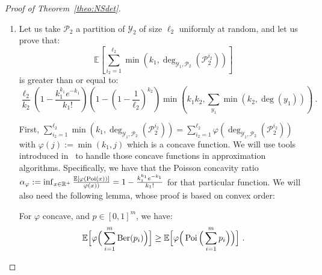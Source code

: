 \begin{proof}[Proof of Theorem~\ref{theo:NSdet}]
\begin{enumerate}
However the function $f : x \mapsto 1-\left(1-\frac{1}{\ell_1}\right)^x$ is nondecreasing concave with $f(0)=0$, so $\frac{f(x)}{x} \geq \frac{f(y)}{y}$ for $x \leq y$. In particular, we have that:
\[ f(\min(k_1,\deg_{\mathcal{Y}_1,\mathcal{P}_2}(\mathcal{P}_2^{i_2}))) \geq \frac{\min(k_1,\deg_{\mathcal{Y}_1,\mathcal{P}_2}(\mathcal{P}_2^{i_2})))}{k_1}f(k_1) \ , \]
and thus:
\begin{equation}
  \begin{aligned}
    \mathbb{E}_{\mathcal{P}_1}[e_{G_W}(\mathcal{P}_1,\mathcal{P}_2)] &\geq \ell_1\sum_{i_2=1}^{\ell_2}\left(1-\left(1-\frac{1}{\ell_1}\right)^{\min(k_1,\deg_{\mathcal{Y}_1,\mathcal{P}_2}(\mathcal{P}_2^{i_2}))}\right)\\
    &\geq \ell_1\frac{\sum_{i_2=1}^{\ell_2}\min(k_1,\deg_{\mathcal{Y}_1,\mathcal{P}_2}(\mathcal{P}_2^{i_2}))}{k_1}\left(1-\left(1-\frac{1}{\ell_1}\right)^{k_1}\right)\\
    &= \frac{\ell_1}{k_1}\left(1-\left(1-\frac{1}{\ell_1}\right)^{k_1}\right)\sum_{i_2=1}^{\ell_2}\min\left(k_1,\deg_{\mathcal{Y}_1,\mathcal{P}_2}(\mathcal{P}_2^{i_2})\right) \ ,
  \end{aligned}
\end{equation} 
which concludes the first part of the proof.
  
\item Let us take $\mathcal{P}_2$ a partition of $\mathcal{Y}_2$ of size $\ell_2$ uniformly at random, and let us prove that:
  \[ \mathbb{E}\left[\sum_{i_2=1}^{\ell_2}\min\left(k_1,\deg_{\mathcal{Y}_1,\mathcal{P}_2}(\mathcal{P}_2^{i_2})\right)\right] \]
  is greater than or equal to:
  \[ \frac{\ell_2}{k_2}\left(1 - \frac{k_1^{k_1}e^{-k_1}}{k_1!}\right)\left(1-\left(1-\frac{1}{\ell_2}\right)^{k_2}\right)\min\left(k_1k_2,\sum_{y_1}\min(k_2,\deg(y_1))\right) \ . \]

  First, $\sum_{i_2=1}^{\ell_2}\min\left(k_1,\deg_{\mathcal{Y}_1,\mathcal{P}_2}(\mathcal{P}_2^{i_2})\right) = \sum_{i_2=1}^{\ell_2}\varphi(\deg_{\mathcal{Y}_1,\mathcal{P}_2}(\mathcal{P}_2^{i_2}))$ with $\varphi(j):=\min(k_1,j)$ which is a concave function. We will use tools introduced in~\cite{BFF21} to handle those concave functions in approximation algorithms. Specifically, we have that the Poisson concavity ratio $\alpha_{\varphi} := \inf_{x \in \mathbb{R}^+} \frac{\mathbb{E}[\varphi(\operatorname{\text{Poi}}(x))]}{\varphi(x))} = 1 - \frac{k_1^{k_1}e^{-k_1}}{k_1!}$ for that particular function. We will also need the following lemma, whose proof is based on convex order:
  \begin{lemma}
    For $\varphi$ concave, and $p \in [0,1]^m$, we have:
    \[\mathbb{E}\Big[\varphi\Big(\sum_{i=1}^m\operatorname{\text{Ber}}(p_i)\Big)\Big] \geq \mathbb{E}\Big[\varphi\Big(\operatorname{\text{Poi}}\Big(\sum_{i=1}^m p_i\Big)\Big)\Big]\ .\]
  \label{lem:ConvexOrder}
\end{lemma}
  

\end{enumerate}
\end{proof}

